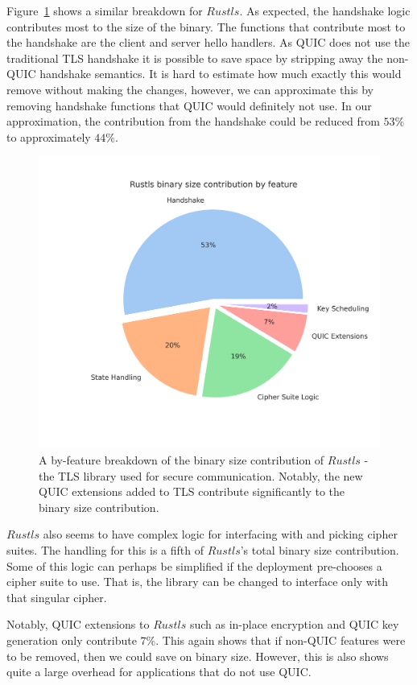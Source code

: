 Figure~\ref{fig:tls_bin_func} shows a similar breakdown for $Rustls$.
As expected, the handshake logic contributes most to the size of the binary.
The functions that contribute most to the handshake are the client and server hello handlers.
As QUIC does not use the traditional TLS handshake it is possible to save space by stripping away the non-QUIC handshake semantics.
It is hard to estimate how much exactly this would remove without making the changes, however, we can approximate this by removing handshake functions that QUIC would definitely not use.
In our approximation, the contribution from the handshake could be reduced from $53\%$ to approximately $44\%$.

\begin{figure}[t]
    \centering
    \includegraphics[width=0.75\linewidth]{images/rustls_binary_by_function.png}
    \caption{A by-feature breakdown of the binary size contribution of $Rustls$ - the TLS library used for secure communication. Notably, the new QUIC extensions added to TLS contribute significantly to the binary size contribution.}
    \label{fig:tls_bin_func}
\end{figure}

$Rustls$ also seems to have complex logic for interfacing with and picking cipher suites.
The handling for this is a fifth of $Rustls$'s total binary size contribution.
Some of this logic can perhaps be simplified if the deployment pre-chooses a cipher suite to use.
That is, the library can be changed to interface only with that singular cipher.

Notably, QUIC extensions to $Rustls$ such as in-place encryption and QUIC key generation only contribute $7\%$.
This again shows that if non-QUIC features were to be removed, then we could save on binary size.
However, this is also shows quite a large overhead for applications that do not use QUIC.

